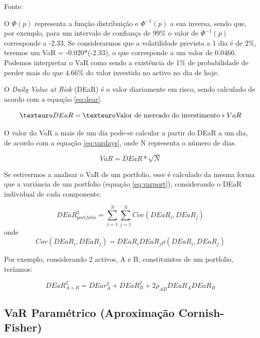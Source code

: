 \documentclass[
  12pt,
  a4paper,
  openany]{book}
\begin{document}
Fonte: \citep[pp.13]{phdthesis}

\justifying
\bigskip

O \(\Phi (p)\) representa a função distribuição e \(\Phi^{-1} (p)\) a sua inversa, sendo que, por exemplo, para um intervalo de confiança de 99\% o valor de \(\Phi^{-1} (p)\) corresponde a -2.33. Se considerarmos que a volatilidade prevista a 1 dia é de 2\%, teremos um VaR = -0.020*(-2.33), o que corresponde a um valor de 0.0466. Podemos interpretar o VaR como sendo a existência de 1\% de probabilidade de perder mais do que 4.66\% do valor investido no activo no dia de hoje.

O \emph{Daily Value at Risk} (DEaR) é o valor diariamente em risco, sendo calculado de acordo com a equação \eqref{eq:dear}.

\begin{equation} 
  €DEaR = € \textnormal{Valor de mercado do investimento} * VaR
  \label{eq:dear}  
\end{equation}

O valor do VaR a mais de um dia pode-se calcular a partir do DEaR a um dia, de acordo com a equação \eqref{eq:vardays}, onde N representa o número de dias.

\begin{equation} 
  VaR = DEaR*\sqrt{N}
  \label{eq:vardays}
\end{equation}

Se estivermos a analisar o VaR de um portfolio, esse é calculado da mesma forma que a variância de um portfolio (equação \eqref{eq:varport}), considerando o DEaR individual de cada componente.

\begin{equation} 
  DEaR_{portfolio}^{2} = \sum_{i=1}^{N}\sum_{j=1}^{N}Cov(DEaR_i,DEaR_j)
  \label{eq:varport}
\end{equation}
onde
\begin{equation} 
  Cov(DEaR_i,DEaR_j) = DEaR_{i}DEaR_{j}\rho(DEaR_i,DEaR_j)
  \label{eq:covport}
\end{equation}

Por exemplo, considerando 2 activos, A e B, constituintes de um portfolio, teríamos:

\begin{equation} 
  DEaR_{A+B}^{2} = DEar_{A}^{2}+DEaR_{B}^{2}+2\rho_{AB} DEaR_{A} DEaR_B
  \label{eq:ab}
\end{equation}

\hypertarget{var-paramuxe9trico-aproximauxe7uxe3o-cornish-fisher}{%
\subsection{VaR Paramétrico (Aproximação Cornish-Fisher)}\label{var-paramuxe9trico-aproximauxe7uxe3o-cornish-fisher}}
\end{document}
